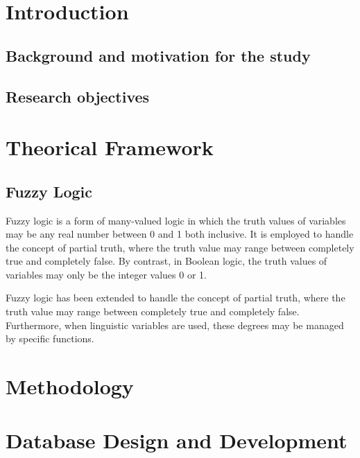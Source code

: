\documentclass[fleqn,11pt]{article}
\begin{document}


\newpage
\tableofcontents

\newpage

\section{Introduction}

\subsection{Background and motivation for the study}

\subsection{Research objectives}

\section{Theorical Framework}

\subsection{Fuzzy Logic}
Fuzzy logic is a form of many-valued logic in which the truth values of variables may be any real number between 0 and 1 both inclusive. It is employed to handle the concept of partial truth, where the truth value may range between completely true and completely false. By contrast, in Boolean logic, the truth values of variables may only be the integer values 0 or 1.

Fuzzy logic has been extended to handle the concept of partial truth, where the truth value may range between completely true and completely false. Furthermore, when linguistic variables are used, these degrees may be managed by specific functions.

\section{Methodology}



\section{Database Design and Development}

\end{document}
